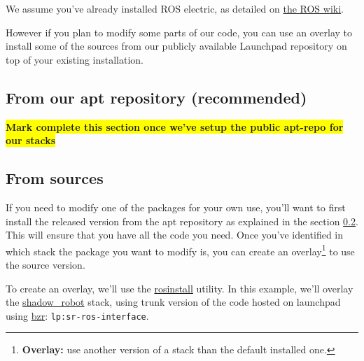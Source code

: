 \documentclass[12pt]{article}
\newcommand{\todo}[1]{\colorbox{yellow}{\textbf{#1}}}
\begin{document}
\par We assume you've already installed ROS electric, as detailed on \href{http://www.ros.org/wiki/electric/Installation/Ubuntu}{the ROS wiki}.

\par However if you plan to modify some parts of our code, you can use an overlay to install some of the sources from our publicly available Launchpad repository on top of your existing installation.

\subsection{From our apt repository (recommended)}
\label{sec:install_apt}
\todo{Mark complete this section once we've setup the public apt-repo for our stacks}


\subsection{From sources}
\label{sec:install_src}
\par If you need to modify one of the packages for your own use, you'll want to first install the released version from the apt repository as explained in the section \ref{sec:install_src}. This will ensure that you have all the code you need. Once you've identified in which stack the package you want to modify is, you can create an overlay\footnote{\textbf{Overlay:} use another version of a stack than the default installed one.} to use the source version.

\par To create an overlay, we'll use the \href{http://ros.org/wiki/rosinstall}{rosinstall} utility. In this example, we'll overlay the \href{http://launchpad.net/sr-ros-interface}{shadow\_robot} stack, using trunk version of the code hosted on launchpad using \href{http://bazaar.canonical.com}{bzr}: \texttt{lp:sr-ros-interface}.
\end{document}
